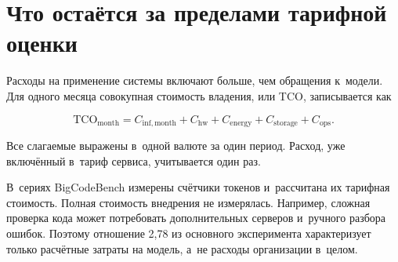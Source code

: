 \section{Что остаётся за пределами тарифной оценки}\label{app:tco}
Расходы на применение системы включают больше, чем обращения к~модели. Для одного месяца совокупная стоимость владения, или TCO, записывается как
\begin{formulakey}
\begin{equation}
\mathrm{TCO}_{\mathrm{month}}=
C_{\mathrm{inf,month}}+C_{\mathrm{hw}}+C_{\mathrm{energy}}+
C_{\mathrm{storage}}+C_{\mathrm{ops}}.
\end{equation}
\begin{symbols}
\end{symbols}
\end{formulakey}
Все слагаемые выражены в~одной валюте за один период. Расход, уже включённый в~тариф сервиса, учитывается один раз.

В~сериях BigCodeBench измерены счётчики токенов и~рассчитана их тарифная стоимость. Полная стоимость внедрения не измерялась. Например, сложная проверка кода может потребовать дополнительных серверов и~ручного разбора ошибок. Поэтому отношение 2,78 из основного эксперимента характеризует только расчётные затраты на модель, а~не расходы организации в~целом.
